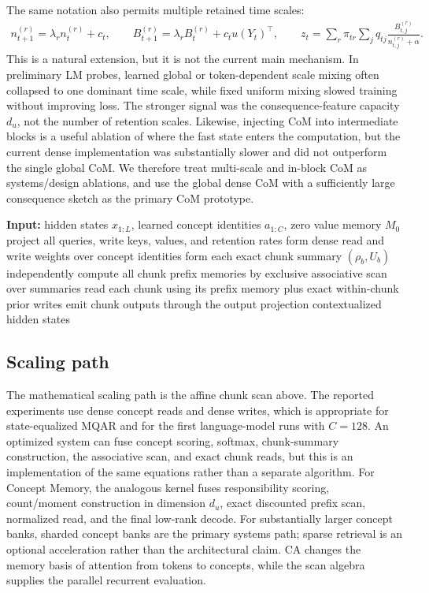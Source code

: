 The same notation also permits multiple retained time scales:
\begin{align*}
n_{t+1}^{(r)}=\lambda_r n_t^{(r)}+c_t,
\qquad
B_{t+1}^{(r)}=\lambda_r B_t^{(r)}+c_tu(Y_t)^\top,
\qquad
z_t=\sum_r \pi_{tr}\sum_j q_{tj}\frac{B_{t,j}^{(r)}}{n_{t,j}^{(r)}+\alpha}.
\end{align*}
This is a natural extension, but it is not the current main mechanism. In preliminary LM probes, learned global or token-dependent scale mixing often collapsed to one dominant time scale, while fixed uniform mixing slowed training without improving loss. The stronger signal was the consequence-feature capacity $d_u$, not the number of retention scales. Likewise, injecting CoM into intermediate blocks is a useful ablation of where the fast state enters the computation, but the current dense implementation was substantially slower and did not outperform the single global CoM. We therefore treat multi-scale and in-block CoM as systems/design ablations, and use the global dense CoM with a sufficiently large consequence sketch as the primary CoM prototype.

\begin{algorithm}[H]
\caption{\textsc{CALayerForward}}
\label{alg:com}
\begin{algorithmic}[1]
\State \textbf{Input:} hidden states $x_{1:L}$, learned concept identities
$a_{1:C}$, zero value memory $M_0$
\State project all queries, write keys, values, and retention rates
\State form dense read and write weights over concept identities
\State form each exact chunk summary $(\rho_b,U_b)$ independently
\State compute all chunk prefix memories by exclusive associative scan over summaries
\State read each chunk using its prefix memory plus exact within-chunk prior writes
\State emit chunk outputs through the output projection
\State \Return contextualized hidden states
\end{algorithmic}
\end{algorithm}

\subsection{Scaling path}

The mathematical scaling path is the affine chunk scan above. The reported experiments use dense concept reads and dense writes, which is appropriate for state-equalized MQAR and for the first language-model runs with $C=128$. An optimized system can fuse concept scoring, softmax, chunk-summary construction, the associative scan, and exact chunk reads, but this is an implementation of the same equations rather than a separate algorithm. For Concept Memory, the analogous kernel fuses responsibility scoring, count/moment construction in dimension $d_u$, exact discounted prefix scan, normalized read, and the final low-rank decode. For substantially larger concept banks, sharded concept banks are the primary systems path; sparse retrieval is an optional acceleration rather than the architectural claim. CA changes the memory basis of attention from tokens to concepts, while the scan algebra supplies the parallel recurrent evaluation.

